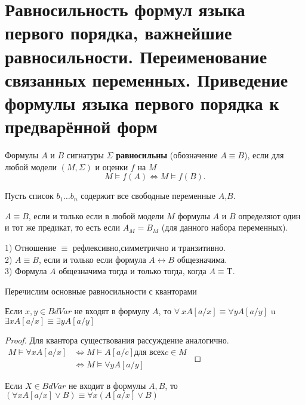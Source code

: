 \section{Равносильность формул языка первого порядка, важнейшие равносильности. Переименование связанных
переменных. Приведение формулы языка первого порядка к предварённой форм}
\begin{definition}
	Формулы $A$ и $B$ сигнатуры $\Sigma$ \textbf{равносильны} (обозначение $A\equiv B$), если для любой модели
	$(M,\Sigma)$ и оценки $f$ на $M$
    $$M \vDash f(A) \Longleftrightarrow M \vDash f(B).$$
\end{definition}
Пусть список $b_1 \dots b_n$ содержит все свободные переменные $A$,$B$.
\begin{proposition}
	$A\equiv B$, если и только если в любой модели $M$ формулы $A$ и $B$ определяют один и тот же предикат, то есть
	если $A_M=B_M$ (для данного набора переменных).
\end{proposition}
\begin{proposition}
1) Отношение $\equiv$ рефлексивно,симметрично и транзитивно.\\
2) $A\equiv B$, если и только если формула $A \leftrightarrow B$ общезначима.\\
3) Формула $A$ общезначима тогда и только тогда, когда $A \equiv$\textup{T}.
\end{proposition}
Перечислим основные равносильности с кванторами
\begin{lemma}
	Если $x,y \in BdVar$ не входят в формулу $A$, то $\forall \:x A[a / x] \equiv \forall y A[a / y]$ u $\exists x
	A[a / x] \equiv \exists y A[a / y] $
\end{lemma}
\begin{proof}
    Для квантора существования рассуждение аналогично.\\
    $\begin{aligned}
    M \vDash \forall x A[a / x] & \Longleftrightarrow M \vDash A[a / c] \text{для всех} c \in M\\
    & \Longleftrightarrow M \vDash \forall y A[a / y]
    \end{aligned}$
\end{proof}
\begin{lemma}
    Если $X\in BdVar$ не входит в формулы $A,B$, то $(\forall x A[a / x] \vee B) \equiv \forall x(A[a / x] \vee B)$
\end{lemma}
